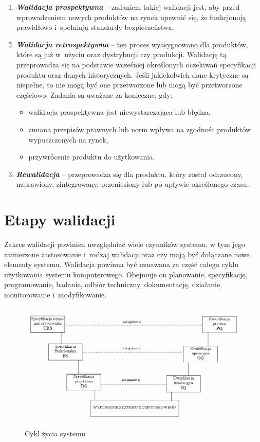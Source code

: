\documentclass{xmgr}
\begin{document}
\begin{enumerate}
  \item \textbf{\textit{Walidacja prospektywna}} – \textcolor{sa}{zadaniem takiej walidacji jest, aby przed wprowadzeniem nowych produktów na rynek upewnić się, że funkcjonują prawidłowo i~spełniają standardy bezpieczeństwa.}
  \item \textbf{\textit{Walidacja retrospektywna}} – \textcolor{sa}{ten proces wyasygnowano dla produktów, które są już w~użyciu oraz dystrybucji czy produkcji. Walidację tą przeprowadza się na podstawie wcześniej określonych oczekiwań specyfikacji produktu oraz danych historycznych. Jeśli jakiekolwiek dane krytyczne są niepełne, to nie mogą być one przetworzone lub mogą być przetworzone częściowo.} \textcolor{sb}{Zadania są uważane za konieczne, gdy:}
\begin{itemize}
\item \textcolor{sa}{walidacja prospektywna jest niewystarczająca lub błędna,}
\item \textcolor{sa}{zmiana przepisów prawnych lub norm wpływa na zgodnośc produktów wypuszczonych na rynek,}
\item \textcolor{sa}{przywrócenie produktu do użytkowania.}
\end{itemize}
  \item \textbf{\textit{Rewalidacja}} – \textcolor{sa}{przeprowadza się dla produktu, który został odrzucony, naprawiony, zintegrowany, przeniesiony lub po upływie określonego czasu.}\cite{Categories}
\end{enumerate}

\section{Etapy walidacji}
\indent \indent \indent \textcolor{sb}{Zakres walidacji powinien uwzględniać wiele czynników systemu,} \textcolor{sa}{w tym jego zamierzone zastosowanie i~rodzaj walidacji oraz czy mają być dołączane nowe elementy systemu.} \textcolor{sb}{Walidacja powinna być uznawana za część całego cyklu użytkowania systemu komputerowego.} \textcolor{sa}{Obejmuje on planowanie, specyfikację, programowanie, badanie, odbiór techniczny, dokumentację, działanie, monitorowanie i~modyfikowanie.}

\begin{figure}[th!]
\centering
\includegraphics[width=.7\hsize]{images/cykl}
\caption{Cykl życia systemu\label{RYS.3}}
\end{figure}
\end{document}
